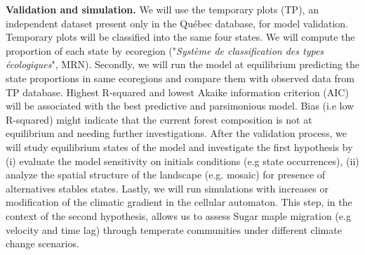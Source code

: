 

\textbf{Validation and simulation.} We will use the temporary plots (TP), an
independent  dataset present only in the Québec database, for model
validation. Temporary plots will be classified into the same four states. We
will compute the proportion of each state by ecoregion ("\textit{Système de
classification des types écologiques}", MRN). Secondly, we will run the model
at equilibrium predicting the state proportions in same ecoregions and compare
them with observed data from TP database. Highest R-squared and lowest Akaike
information criterion (AIC) will be associated with the best predictive and
parsimonious model. Bias (i.e low R-squared) might indicate that the current
forest composition is not at equilibrium and needing further investigations.
After the validation process, we will study equilibrium states of the model
and investigate the first hypothesis by (i) evaluate the model sensitivity on
initials conditions (e.g state occurrences), (ii) analyze the spatial
structure of the landscape (e.g. mosaic) for presence of alternatives stables
states. Lastly, we will run simulations with increases or modification of the
climatic gradient in the cellular automaton. This step, in the context of the
second hypothesis, allows us to assess Sugar maple migration (e.g velocity and
time lag) through  temperate communities under different climate change
scenarios.


\clearpage
\small

